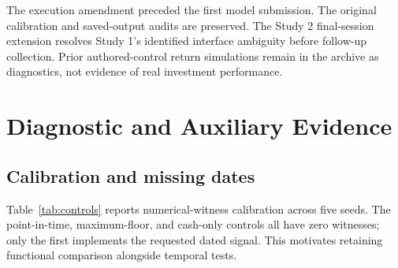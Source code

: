 \documentclass[10pt,twocolumn,a4paper]{article}
\begin{document}
The execution amendment preceded the first model submission. The original calibration and saved-output audits are preserved. The Study 2 final-session extension resolves Study 1's identified interface ambiguity before follow-up collection. Prior authored-control return simulations remain in the archive as diagnostics, not evidence of real investment performance.

\section{Diagnostic and Auxiliary Evidence}
\subsection{Calibration and missing dates}
\label{app:secondary}
Table~\ref{tab:controls} reports numerical-witness calibration across five seeds. The point-in-time, maximum-floor, and cash-only controls all have zero witnesses; only the first implements the requested dated signal. This motivates retaining functional comparison alongside temporal tests.
\end{document}
